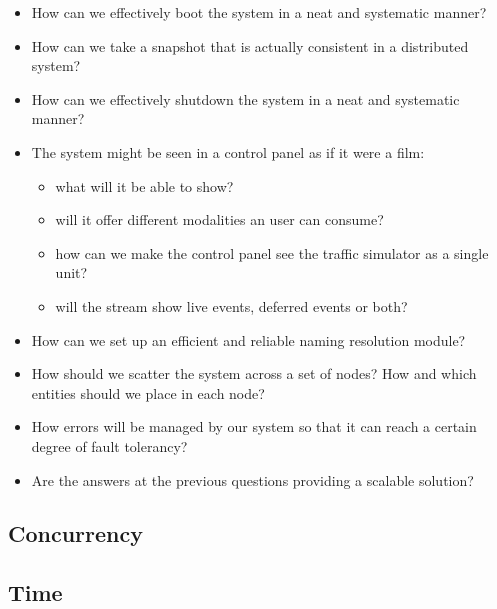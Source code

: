 \begin{itemize}
\item How can we effectively boot the system in a neat and systematic manner?
\item How can we take a snapshot that is actually consistent in a distributed
  system?
\item How can we effectively shutdown the system in a neat and systematic
  manner?
\item The system might be seen in a control panel as if it were a film:
  \begin{itemize}
  \item what will it be able to show?
  \item will it offer different modalities an user can consume?
  \item how can we make the control panel see the traffic simulator as a
    single unit?
  \item will the stream show live events, deferred events or both?
  \end{itemize}
\item How can we set up an efficient and reliable naming resolution module?
\item How should we scatter the system across a set of nodes? How and which
  entities should we place in each node?
\item How errors will be managed by our system so that it can reach a certain
  degree of fault tolerancy?
\item Are the answers at the previous questions providing a scalable solution?
\end{itemize}

\subsection{Concurrency}

\subsection{Time}

